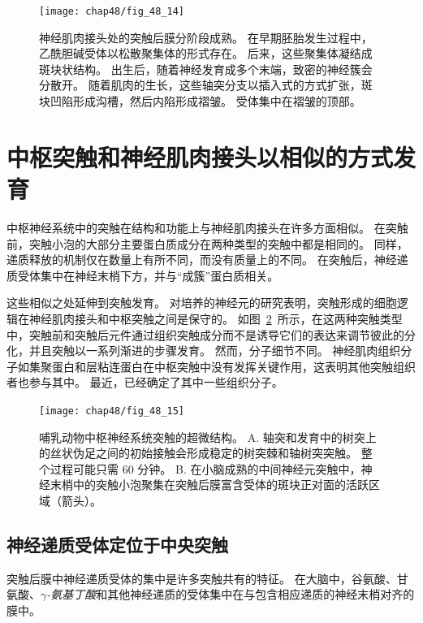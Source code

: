 \begin{figure}[htbp]
	\centering
	\texttt{[image: chap48/fig\_48\_14]}
	\caption{神经肌肉接头处的突触后膜分阶段成熟。
		在早期胚胎发生过程中，乙酰胆碱受体以松散聚集体的形式存在。
		后来，这些聚集体凝结成斑块状结构。
		出生后，随着神经发育成多个末端，致密的神经簇会分散开。
		随着肌肉的生长，这些轴突分支以插入式的方式扩张，斑块凹陷形成沟槽，然后内陷形成褶皱。
		受体集中在褶皱的顶部\cite{sanes2001induction}。}
	\label{fig:48_14}
\end{figure}



\section{中枢突触和神经肌肉接头以相似的方式发育}

中枢神经系统中的突触在结构和功能上与神经肌肉接头在许多方面相似。
在突触前，突触小泡的大部分主要蛋白质成分在两种类型的突触中都是相同的。
同样，递质释放的机制仅在数量上有所不同，而没有质量上的不同。
在突触后，神经递质受体集中在神经末梢下方，并与“成簇”蛋白质相关。


这些相似之处延伸到突触发育。
对培养的神经元的研究表明，突触形成的细胞逻辑在神经肌肉接头和中枢突触之间是保守的。
如图~\ref{fig:48_15}~所示，在这两种突触类型中，突触前和突触后元件通过组织突触成分而不是诱导它们的表达来调节彼此的分化，并且突触以一系列渐进的步骤发育。
然而，分子细节不同。
神经肌肉组织分子如集聚蛋白和层粘连蛋白在中枢突触中没有发挥关键作用，这表明其他突触组织者也参与其中。
最近，已经确定了其中一些组织分子。


\begin{figure}[htbp]
	\centering
	\texttt{[image: chap48/fig\_48\_15]}
	\caption{哺乳动物中枢神经系统突触的超微结构。
		A. 轴突和发育中的树突上的丝状伪足之间的初始接触会形成稳定的树突棘和轴树突突触。
		整个过程可能只需 60 分钟。
		B. 在小脑成熟的中间神经元突触中，神经末梢中的突触小泡聚集在突触后膜富含受体的斑块正对面的活跃区域（箭头）。}
	\label{fig:48_15}
\end{figure}



\subsection{神经递质受体定位于中央突触}

突触后膜中神经递质受体的集中是许多突触共有的特征。
在大脑中，谷氨酸、甘氨酸、\textit{$ \gamma $-氨基丁酸}和其他神经递质的受体集中在与包含相应递质的神经末梢对齐的膜中。



